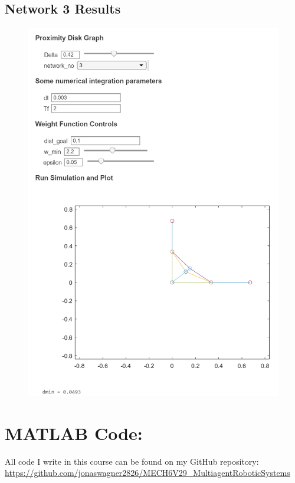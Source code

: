 \documentclass[]{article}
\numberwithin{equation}{section}
\begin{document}
\subsection{Network 3 Results}
\begin{figure}[h]
    \centering
    \includegraphics[height = 0.75 \textheight]{figs/pblm6_network3.png}
\end{figure}


\newpage
\appendix
\section{MATLAB Code:}\label{apx:matlab}
All code I write in this course can be found on my GitHub repository:\\
\href{https://github.com/jonaswagner2826/MECH6V29_MultiagentRoboticSystems}{https://github.com/jonaswagner2826/MECH6V29\_MultiagentRoboticSystems}

% 

% 
% 
\end{document}

